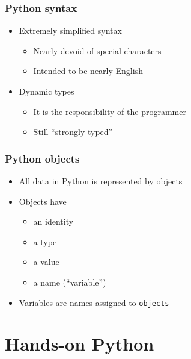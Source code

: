 \documentclass[xcolor=table,10pt,final]{beamer}
\begin{document}
\begin{frame}
  \frametitle{Python syntax}
  \begin{itemize}
    \item Extremely simplified syntax
      \begin{itemize}
        \item Nearly devoid of special characters
        \item Intended to be nearly English
      \end{itemize}
    \item Dynamic types
      \begin{itemize}
        \item It is the responsibility of the programmer
        \item Still ``strongly typed''
      \end{itemize}
  \end{itemize}
\end{frame}

\begin{frame}[fragile]
  \frametitle{Python objects}
  \begin{itemize}
    \item All data in Python is represented by objects
    \item Objects have
      \begin{itemize}
        \item an identity
        \item a type
        \item a value
        \item a name (``variable'')\footnotemark
      \end{itemize}
    \item Variables are names assigned to {\tt objects}
  \end{itemize}
  {\tiny {}}
\end{frame}

\section{Hands-on Python}
\frame{\sectionpage}
\end{document}

